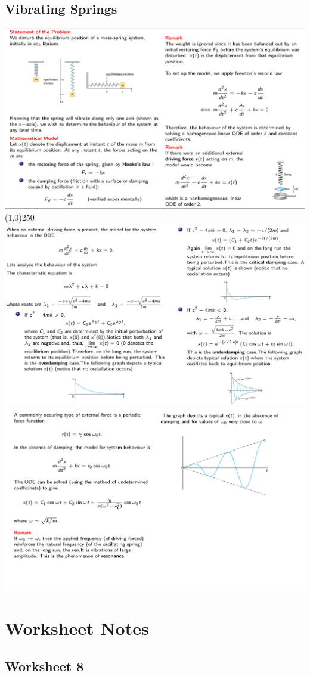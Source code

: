 \documentclass[11pt]{article}
\theoremstyle{definition}
\begin{document}
\subsection{Vibrating Springs}
\includegraphics[scale = 0.45]{images/vb1.png}\\
\line(1,0){250}\\
\includegraphics[scale = 0.45]{images/vb2.png}\\
\includegraphics[scale = 0.48]{images/vb3.png}
\section{Worksheet Notes}
\subsection{Worksheet 8}
\end{document}
